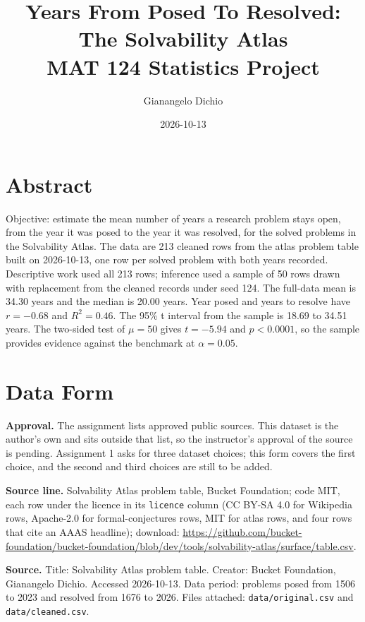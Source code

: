 \documentclass[11pt]{article}
\title{Years From Posed To Resolved: The Solvability Atlas\\\large MAT 124 Statistics Project}
\author{Gianangelo Dichio}
\date{2026-10-13}
\begin{document}
\maketitle


\section*{Abstract}
\noindent{}

\medskip
Objective: estimate the mean number of years a research problem stays open, from the year it was posed to the year it was resolved, for the solved problems in the Solvability Atlas. The data are 213 cleaned rows from the atlas problem table built on 2026-10-13, one row per solved problem with both years recorded. Descriptive work used all 213 rows; inference used a sample of 50 rows drawn with replacement from the cleaned records under seed 124. The full-data mean is 34.30 years and the median is 20.00 years. Year posed and years to resolve have $r = -0.68$ and $R^2 = 0.46$. The 95\% t interval from the sample is 18.69 to 34.51 years. The two-sided test of $\mu = 50$ gives $t = -5.94$ and $p < 0.0001$, so the sample provides evidence against the benchmark at $\alpha = 0.05$.


\section{Data Form}

\textbf{Approval.} The assignment lists approved public sources. This dataset is the author's own and sits outside that list, so the instructor's approval of the source is pending. Assignment 1 asks for three dataset choices; this form covers the first choice, and the second and third choices are still to be added.

\textbf{Source line.} Solvability Atlas problem table, Bucket Foundation; code MIT, each row under the licence in its \texttt{licence} column (CC BY-SA 4.0 for Wikipedia rows, Apache-2.0 for formal-conjectures rows, MIT for atlas rows, and four rows that cite an AAAS headline); download: \url{https://github.com/bucket-foundation/bucket-foundation/blob/dev/tools/solvability-atlas/surface/table.csv}.

\textbf{Source.} Title: Solvability Atlas problem table. Creator: Bucket Foundation, Gianangelo Dichio. Accessed 2026-10-13. Data period: problems posed from 1506 to 2023 and resolved from 1676 to 2026. Files attached: \texttt{data/original.csv} and \texttt{data/cleaned.csv}.
\end{document}
